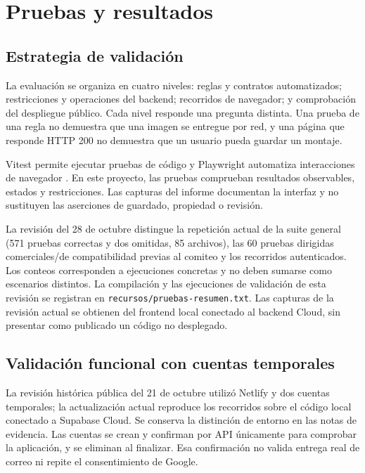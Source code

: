 \documentclass[12pt,letterpaper]{article}
\newcommand{\ruta}[1]{{\urlstyle{tt}\nolinkurl{#1}}}
\newcommand{\pagina}{\clearpage}
\begin{document}

\pagina

\section{Pruebas y resultados}
\subsection{Estrategia de validación}
La evaluación se organiza en cuatro niveles: reglas y contratos automatizados; restricciones y operaciones del backend; recorridos de navegador; y comprobación del despliegue público. Cada nivel responde una pregunta distinta. Una prueba de una regla no demuestra que una imagen se entregue por red, y una página que responde HTTP 200 no demuestra que un usuario pueda guardar un montaje.

Vitest permite ejecutar pruebas de código y Playwright automatiza interacciones de navegador \citep{vitest,playwright}. En este proyecto, las pruebas comprueban resultados observables, estados y restricciones. Las capturas del informe documentan la interfaz y no sustituyen las aserciones de guardado, propiedad o revisión.

La revisión del 28 de octubre distingue la repetición actual de la suite general (571 pruebas correctas y dos omitidas, 85 archivos), las 60 pruebas dirigidas comerciales/de compatibilidad previas al comiteo y los recorridos autenticados. Los conteos corresponden a ejecuciones concretas y no deben sumarse como escenarios distintos. La compilación y las ejecuciones de validación de esta revisión se registran en \ruta{recursos/pruebas-resumen.txt}. Las capturas de la revisión actual se obtienen del frontend local conectado al backend Cloud, sin presentar como publicado un código no desplegado.

\subsection{Validación funcional con cuentas temporales}
La revisión histórica pública del 21 de octubre utilizó Netlify y dos cuentas temporales; la actualización actual reproduce los recorridos sobre el código local conectado a Supabase Cloud. Se conserva la distinción de entorno en las notas de evidencia. Las cuentas se crean y confirman por API únicamente para comprobar la aplicación, y se eliminan al finalizar. Esa confirmación no valida entrega real de correo ni repite el consentimiento de Google.
\end{document}
